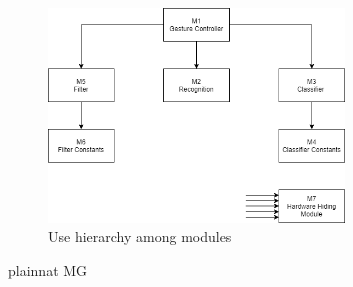 \documentclass[12pt, titlepage]{article}
\begin{document}
\begin{figure}[H]
\centering
\includegraphics[width=0.7\textwidth]{UsesHierarchy.png}
\caption{Use hierarchy among modules}
\label{FigUH}
\end{figure}


 {plainnat}
 {MG}
\end{document}
